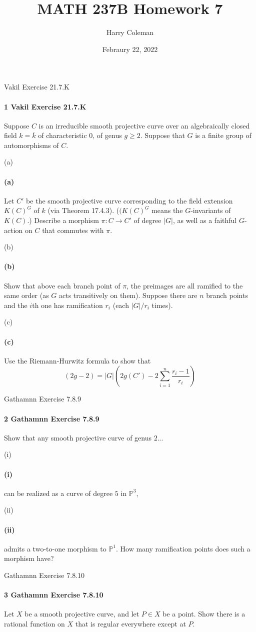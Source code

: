 \documentclass[12pt]{article}
\renewcommand{\maketitle}{\thispagestyle{title}}
\newlength{\myparskip}
\newenvironment{fullbox}{\begin{lrbox}{\savefullbox}\begin{minipage}{\dimexpr\textwidth-2\fboxsep\relax}\setlength{\parskip}{\myparskip}}{\end{minipage}\end{lrbox}\framebox[\textwidth]{\usebox{\savefullbox}}}
\newenvironment{pbox}[1][]{\begin{fullbox}\ifx#1\empty\else\paragraph{#1}\phantom{}\fi}{\end{fullbox}}
\theoremstyle{definition}
\renewcommand{\P}{\mathbb{P}}
\newcommand{\<}{\langle}
\renewcommand{\>}{\rangle}
\newcommand{\clo}{\overline}
\begin{document}
\title{MATH 237B Homework 7}
\author{Harry Coleman}
\date{Febraury 22, 2022}
\maketitle

\begin{pbox}[1 Vakil Exercise 21.7.K]
    Suppose $C$ is an irreducible smooth projective curve over an algebraically closed field $k = \clo{k}$ of characteristic $0$, of genus $g \geq 2$.
    Suppose that $G$ is a finite group of automorphisms of $C$.
\end{pbox}

\begin{pbox}[(a)]
    Let $C'$ be the smooth projective curve corresponding to the field extension $K(C)^G$ of $k$ (via Theorem 17.4.3).
    ($(K(C)^G$ means the $G$-invariants of $K(C)$.)
    Describe a morphism $\pi : C \to C'$ of degree $|G|$, as well as a faithful $G$-action on $C$ that commutes with $\pi$.
\end{pbox}



\begin{pbox}[(b)]
    Show that above each branch point of $\pi$, the preimages are all ramified to the same order (as $G$ acts transitively on them).
    Suppose there are $n$ branch points and the $i$th one has ramification $r_i$ (each $|G|/r_i$ times).
\end{pbox}

\begin{pbox}[(c)]
    Use the Riemann-Hurwitz formula to show that
    \[
        (2g - 2) = |G| \left(2g(C') - 2 \sum_{i=1}^{n} \frac{r_i - 1}{r_i}\right)
    \]
\end{pbox}

\begin{pbox}[2 Gathamnn Exercise 7.8.9]
    Show that any smooth projective curve of genus $2$...
\end{pbox}

\begin{pbox}[(i)]
    can be realized as a curve of degree $5$ in $\P^3$,
\end{pbox}

\begin{pbox}[(ii)]
    admits a two-to-one morphism to $\P^1$.
    How many ramification points does such a morphism have?
\end{pbox}

\begin{pbox}[3 Gathamnn Exercise 7.8.10]
    Let $X$ be a smooth projective curve, and let $P \in X$ be a point.
    Show there is a rational function on $X$ that is regular everywhere except at $P$.
\end{pbox}
\end{document}
